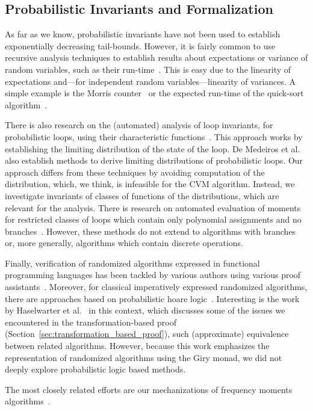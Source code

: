 \subsection{Probabilistic Invariants and Formalization}
As far as we know, probabilistic invariants have not been used to establish exponentially decreasing tail-bounds.
However, it is fairly common to use recursive analysis techniques to establish results about expectations or variance of random variables, such as their run-time~\cite[Section 1.4]{motwani1995}.
This is easy due to the linearity of expectations and---for independent random variables---linearity of variances.
A simple example is the Morris counter~\cite{morris1978} or the expected run-time of the quick-sort algorithm~\cite[Section 2.5]{mitzenmacher2005}.

There is also research on the (automated) analysis of loop invariants, for probabilistic loops, using their characteristic functions~\cite{batz2023, mciver2005}.
This approach works by establishing the limiting distribution of the state of the loop.
De Medeiros et al.~\cite[Section 3.2]{demedeiros2024} also establish methods to derive limiting distributions of probabilistic loops.
Our approach differs from these techniques by avoiding computation of the distribution, which, we think, is infeasible for the CVM algorithm.
Instead, we investigate invariants of classes of functions of the distributions, which are relevant for the analysis.
There is research on automated evaluation of moments for restricted classes of loops which contain only polynomial assignments and no branches~\cite{bartocci2019,kofnov2022}.
However, these methods do not extend to algorithms with branches or, more generally, algorithms which contain discrete operations.

Finally, verification of randomized algorithms expressed in functional programming languages has been tackled by various authors using various proof assistants~\cite{audebaud2006,bosshard2024,demedeiros2024, eberl2020,gopinathan20,hurd03, Probabilistic_Prime_Tests-AFP, tan2024, tassarotti2021}.
Moreover, for classical imperatively expressed randomized algorithms, there are approaches based on probabilistic hoare logic~\cite{denhartog1999}.
Interesting is the work by Haselwarter et al.~\cite{haselwarter2025} in this context, which discusses some of the issues we encountered in the transformation-based proof (Section~\ref{sec:transformation_based_proof}), such (approximate) equivalence between related algorithms.
However, because this work emphasizes the representation of randomized algorithms using the Giry monad, we did not deeply explore probabilistic logic based methods.

The most closely related efforts are our mechanizations of frequency moments algorithms~\cite{karayel2022, karayel2023}.
